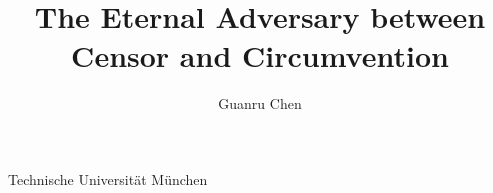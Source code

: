 \title{The Eternal Adversary between Censor and
Circumvention}
\author{Guanru Chen}
\newcommand{\presdatum}{December 2024}
\institute
{
  Technische Universität München\\
}
